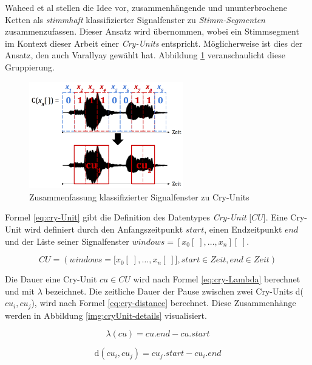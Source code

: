 Waheed et al \cite{vad_entropy} stellen die Idee vor, zusammenhängende und ununterbrochene Ketten als \emph{stimmhaft} klassifizierter Signalfenster zu \emph{Stimm-Segmenten} zusammenzufassen. Dieser Ansatz wird übernommen, wobei ein Stimmsegment im Kontext dieser Arbeit einer \emph{Cry-Units} entspricht. Möglicherweise ist dies der Ansatz, den auch  Varallyay \cite[S. 16 - 17]{cry_thesis} gewählt hat. Abbildung \ref{img:cryUnit} veranschaulicht diese Gruppierung. 

\begin{figure}[h]
	\centering
	\includegraphics[width=0.6\textwidth]{bilder/cry-Unit02.png}
	\caption{Zusammenfassung klassifizierter Signalfenster zu Cry-Units}
	\label{img:cryUnit}
\end{figure}

Formel \ref{eq:cry-Unit} gibt die Definition des Datentypes \emph{Cry-Unit} [$CU$]. Eine Cry-Unit wird definiert durch den Anfangszeitpunkt $start$, einen Endzeitpunkt $end$ und der Liste seiner Signalfenster $windows = [x_0[\;], \ldots, x_n][\;]$.

\begin{equation}
CU = (windows = \big[x_0[\;] ,\ldots, x_n[\;] \big], start \in Zeit, end \in Zeit)
\label{eq:cry-Unit}
\end{equation}

Die Dauer eine Cry-Unit $cu \in CU$ wird nach Formel \ref{eq:cry-Lambda} berechnet und mit $\lambda$ bezeichnet. Die zeitliche Dauer der Pause zwischen zwei Cry-Units d($cu_i, cu_j$), wird nach Formel \ref{eq:cry-distance} berechnet. Diese Zusammenhänge werden in Abbildung \ref{img:cryUnit-details} visualisiert.\cite[S. 2]{vad_entropy}

\begin{equation}
\lambda (cu) = cu.end - cu.start
\label{eq:cry-Lambda}
\end{equation}

\begin{equation}
\text{d}(cu_i, cu_j) = cu_j.start - cu_i.end
\label{eq:cry-distance}
\end{equation}

